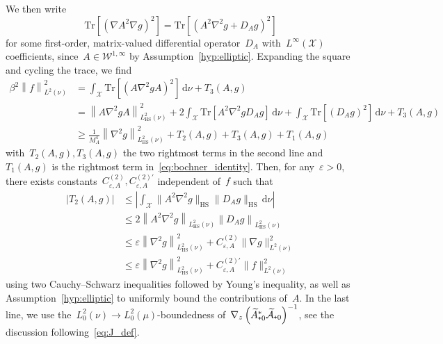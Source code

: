 \documentclass[10pt]{article}
\renewcommand{\d}{\mathrm{d}}
\newcommand{\cX}{\mathcal{X}}
\newcommand{\cA}{\mathcal{A}}
\newcommand{\subplus}{\textnormal{\texttt{+}}}
\newcommand{\1}{\mathbbm 1}
\newcommand{\cW}{\mathcal{W}}
\begin{document}
We then write
\begin{equation}
    \mathrm{Tr}\left[\left(\nabla A^2\nabla g\right)^2\right]=\mathrm{Tr}\left[\left( A^2\nabla^2 g + D_A g\right)^2\right]
\end{equation}
for some first-order, matrix-valued differential operator~$D_A$ with~$L^\infty(\cX)$ coefficients, since~${A\in\cW^{1,\infty}}$ by Assumption~\ref{hyp:elliptic}. Expanding the square and cycling the trace, we find
\begin{equation}
    \begin{aligned}
        \label{eq:desired_bound}
    \beta^2\left\|f\right\|^2_{L^2(\nu)} &= \int_{\cX}\mathrm{Tr}\left[(A\nabla^2 g A)^2\right]\,\d \nu + T_3(A,g)\\
    &=\left\|A\nabla^2 g A\right\|^2_{L^2_{\mathrm{HS}}(\nu)}+2 \int_\cX \mathrm{Tr}\left[A^2\nabla^2 g D_A g\right]\,\d \nu + \int_{\cX}\mathrm{Tr}\left[\left(D_A g\right)^2\right]\,\d \nu+T_3(A,g)\\
    &\geq \frac1{M_A^4}\left\|\nabla^2 g\right\|^2_{L^2_{\mathrm{HS}}(\nu)}+T_2(A,g)+ T_3(A,g)+T_1(A,g)
    \end{aligned}
\end{equation}
with~$T_2(A,g),T_3(A,g)$ the two rightmost terms in the second line and~$T_1(A,g)$ is the rightmost term in~\eqref{eq:bochner_identity}. Then, for any~$\varepsilon>0$, there exists constants~$C^{(2)}_{\varepsilon,A},C^{(2)'}_{\varepsilon,A}$ independent of~$f$ such that
\begin{equation}
    \begin{aligned}
        \label{eq:t2_bound}
        |T_2(A,g)| &\leq \left|\int_{\cX}\|A^2\nabla^2 g\|_{\mathrm{HS}}\|D_A g\|_{\mathrm{HS}}\,\d \nu\right|\\
        &\leq 2\left\|A^2\nabla^2 g\right\|_{L^2_{\mathrm{HS}}(\nu)}\left\|D_A g\right\|_{L^2_{\mathrm{HS}}(\nu)}\\
        &\leq \varepsilon\left\|\nabla^2 g\right\|^2_{L^2_{\mathrm{HS}}(\nu)}+C^{(2)}_{\varepsilon,A}\|\nabla g\|^2_{L^2(\nu)}\\
        &\leq \varepsilon\left\|\nabla^2 g\right\|^2_{L^2_{\mathrm{HS}}(\nu)} + C^{(2)'}_{\varepsilon,A}\|f\|^2_{L^2(\nu)}
    \end{aligned}
\end{equation}
using two Cauchy--Schwarz inequalities followed by Young's inequality, as well as Assumption~\ref{hyp:elliptic} to uniformly bound the contributions of~$A$. In the last line, we use the~$L_0^2(\nu)\to L_0^2(\mu)$-boundedness of~$\nabla_z\left(\widetilde{A}_{\subplus 0}^*\widetilde{\cA}_{\subplus 0}\right)^{-1}$, see the discussion following~\eqref{eq:J_def}.
\end{document}
